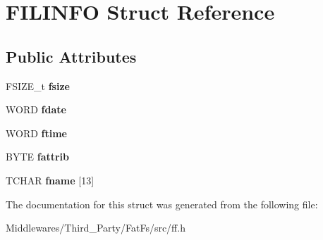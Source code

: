 \hypertarget{struct_f_i_l_i_n_f_o}{}\section{F\+I\+L\+I\+N\+FO Struct Reference}
\label{struct_f_i_l_i_n_f_o}
\subsection*{Public Attributes}
\begin{DoxyCompactItemize}
\item 
\mbox{\label{struct_f_i_l_i_n_f_o_a9e5b78ed7190f73de3ebcbdfbd6d1844}} 
F\+S\+I\+Z\+E\+\_\+t {\bfseries fsize}
\item 
\mbox{\label{struct_f_i_l_i_n_f_o_a7c01c48a15b1b49da459924437b0bd52}} 
W\+O\+RD {\bfseries fdate}
\item 
\mbox{\label{struct_f_i_l_i_n_f_o_ae0f751b79621bf7b29669f177bbe6b9a}} 
W\+O\+RD {\bfseries ftime}
\item 
\mbox{\label{struct_f_i_l_i_n_f_o_a838d542585831b085537b363f18205c0}} 
B\+Y\+TE {\bfseries fattrib}
\item 
\mbox{\label{struct_f_i_l_i_n_f_o_abd852510f2f79b4ec773156d8942dc7c}} 
T\+C\+H\+AR {\bfseries fname} \mbox{[}13\mbox{]}
\end{DoxyCompactItemize}


The documentation for this struct was generated from the following file\+:\begin{DoxyCompactItemize}
\item 
Middlewares/\+Third\+\_\+\+Party/\+Fat\+Fs/src/ff.\+h\end{DoxyCompactItemize}
